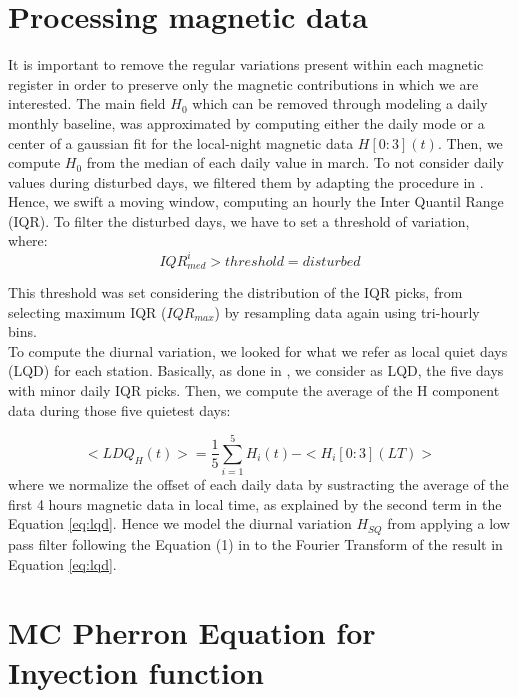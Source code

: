 \documentclass[a4paper]{article}
\theoremstyle{plain}
\theoremstyle{definition}
\begin{document}
	
	\appendix
	\section{Processing magnetic data}
	\label{a1}
	It is important to remove the regular variations present within each magnetic register in order to preserve only the magnetic contributions in which we are interested. The main field $H_0$ which can be removed through modeling a daily monthly baseline, was approximated by computing either the daily mode or a center of a gaussian fit \citep{baseline_Gjerloev} for the local-night magnetic data $H[0:3](t)$. Then, we compute $H_0$ from the median of each daily value in march. To not consider daily values during disturbed days, we filtered them by adapting the procedure in \cite{vanKampt}. Hence, we swift a moving window, computing an hourly the Inter Quantil Range (IQR). To filter the disturbed days, we have to set a threshold of variation, where:
	\begin{equation}
		IQR_{med}^i > threshold = disturbed
	\end{equation}
	
	This threshold was set considering the distribution of the IQR picks, from selecting maximum IQR ($IQR_{max}$) by resampling data again using tri-hourly bins.\\
	
	To compute the diurnal variation, we looked for what we refer as local quiet days (LQD) for each station. Basically, as done in \cite{vanKampt}, we consider as LQD, the five days with minor daily IQR picks. Then, we compute the average of the H component data during those five quietest days:
	
	\begin{equation}
		\label{eq:lqd}
		<LDQ_H(t)> = \frac{1}{5} \sum_{i=1}^5 H_i(t) - <H_i[0:3](LT)>
	\end{equation}
	\noindent where we normalize the offset of each daily data by sustracting the average of the first 4 hours magnetic data in local time, as explained by the second term in the Equation \ref{eq:lqd}. Hence we model the diurnal variation $H_{SQ}$ from applying a low pass filter following the Equation (1) in \cite{vanKampt} to the Fourier Transform of the result in Equation \ref{eq:lqd}.
	
	\section{MC Pherron Equation for Inyection function}
	
\end{document}
